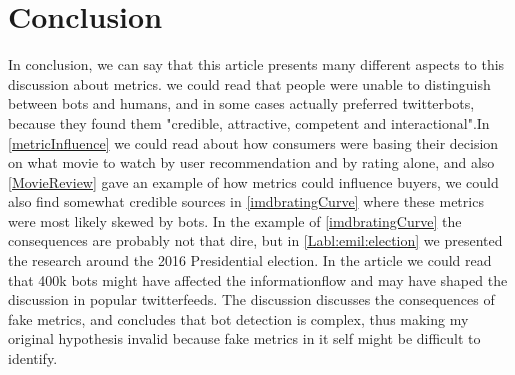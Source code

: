 \section{Conclusion}
In conclusion, we can say that this article presents many different aspects to this discussion about metrics. we could read that people were unable to distinguish between bots and humans, and in some cases actually preferred twitterbots, because they found them "credible, attractive, competent and interactional"\cite{Edwards2014372}.In \ref{metricInfluence} we could read about how consumers were basing their decision on what movie to watch by user recommendation and by rating alone, and also \ref{MovieReview} gave an example of how metrics could influence buyers, we could also find somewhat credible sources in \ref{imdbratingCurve} where these metrics were most likely skewed by bots. In the example of \ref{imdbratingCurve} the consequences are probably not that dire, but in \ref{Labl:emil:election} we presented the research around the 2016 Presidential election. In the article we could read that 400k bots might have affected the informationflow and may have shaped the discussion in popular twitterfeeds. The discussion discusses the consequences of fake metrics, and concludes that bot detection is complex, thus making my original hypothesis invalid because fake metrics in it self might be difficult to identify. 